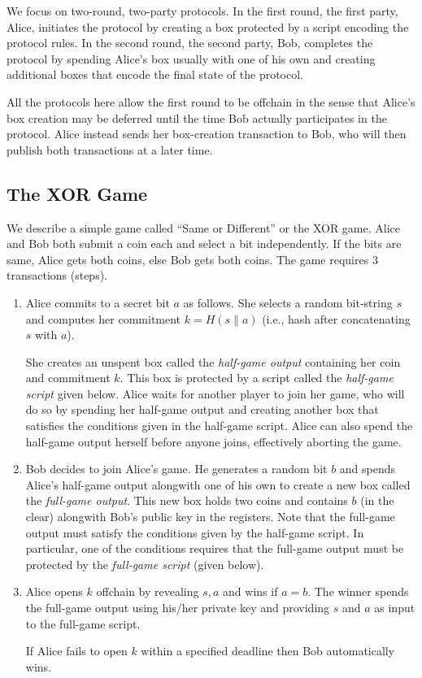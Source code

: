 \documentclass[11pt]{article}
\begin{document}
We focus on two-round, two-party protocols. %
In the first round, the first party, Alice, initiates the protocol by creating a box  protected by a script encoding the protocol rules. In the second round, the second party, Bob, completes the protocol by spending Alice's box usually with one of his own and creating additional boxes that encode the final state of the protocol. 

All the protocols here allow the first round to be offchain in the sense that Alice's box creation may be deferred until the time Bob actually participates in the protocol. Alice instead sends her box-creation transaction to Bob, who will then publish both transactions at a later time. 
\subsection{The XOR Game}

We describe a simple game called ``Same or Different'' or the XOR game. Alice and Bob both submit a coin each and select a bit independently. If the bits are same, Alice gets both coins, else Bob gets both coins. The game requires 3 transactions (steps). 
\begin{enumerate}
	\item Alice commits to a secret bit $a$ as follows. She selects a random bit-string $s$ and computes her commitment $k = H(s\|a)$ (i.e., hash after concatenating $s$ with $a$).
	
	She creates an unspent box called the {\em half-game output} containing her coin and commitment $k$. This box is protected by a script called the {\em half-game script}  given below. Alice waits for another player to join her game, who will do so by spending her half-game output and creating another box that satisfies the conditions given in the half-game script. Alice can also spend the half-game output herself before anyone joins, effectively aborting the game. 
	
	\item Bob decides to join Alice's game. He generates a random bit $b$ and spends Alice's half-game output alongwith one of his own to create a new box called the {\em full-game output}. This new box  holds two coins and contains $b$ (in the clear) alongwith Bob's public key in the registers. 
	Note that the full-game output must satisfy the conditions given by the half-game script. In particular, one of the conditions requires that the full-game output must be protected by the {\em full-game script} (given below).
	\item Alice opens $k$ offchain by revealing $s, a$ and wins if $a = b$. The winner spends the full-game output using his/her private key and providing $s$ and $a$ as input to the full-game script.

	If Alice fails to open $k$ within a specified deadline then Bob automatically wins. 
\end{enumerate}
\end{document}
